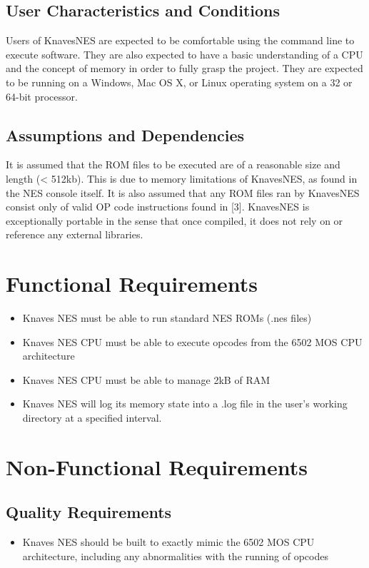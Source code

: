 \documentclass[12pt]{article}
\begin{document}
	\subsection{User Characteristics and Conditions}
		Users of KnavesNES are expected to be comfortable using the command line to execute software. They are also expected to have a basic understanding of a CPU and the concept of memory in order to fully grasp the project. They are expected to be running on a Windows, Mac OS X, or Linux operating system on a 32 or 64-bit processor.
	\subsection{Assumptions and Dependencies}
		It is assumed that the ROM files to be executed are of a reasonable size and length (< 512kb). This is due to memory limitations of KnavesNES, as found in the NES console itself. It is also assumed that any ROM files ran by KnavesNES consist only of valid OP code instructions found in [3]. KnavesNES is exceptionally portable in the sense that once compiled, it does not rely on or reference any external libraries. 
\section{Functional Requirements}
	\begin{itemize}
		\item Knaves NES must be able to run standard NES ROMs (.nes files)
		\item Knaves NES CPU must be able to execute opcodes from the 6502 MOS CPU architecture
		\item Knaves NES CPU must be able to manage 2kB of RAM
		\item Knaves NES will log its memory state into a .log file in the user's working directory at a specified interval.
	\end{itemize}
\section{Non-Functional Requirements}
	\subsection{Quality Requirements}
		\begin{itemize}
			\item Knaves NES should be built to exactly mimic the 6502 MOS CPU architecture, including any abnormalities with the running of opcodes
		\end{itemize}
\end{document}
